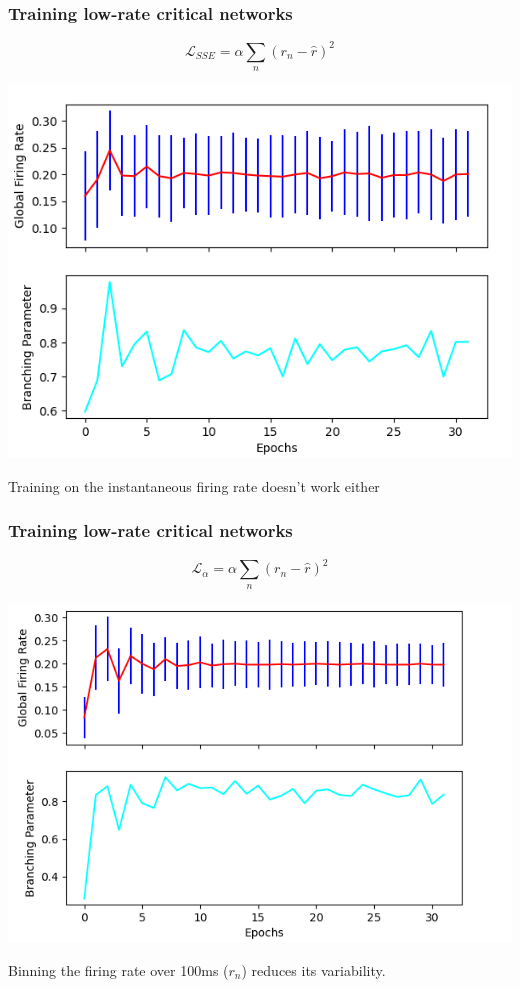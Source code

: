 \documentclass{beamer}
\begin{document}
\begin{frame}[plain]
\frametitle{Training low-rate critical networks} 

\begin{equation*}
\mathcal{L}_{SSE} = \alpha\sum_{n} (r_{n} - \hat{r})^{2}
\end{equation*}

\begin{center}
\includegraphics[scale=0.5]{sse-vars}
\end{center}

Training on the instantaneous firing rate doesn't work either

\end{frame}

\begin{frame}[plain]
\frametitle{Training low-rate critical networks} 

\begin{equation*}
\mathcal{L}_{\alpha} = \alpha\sum_{n} (r_{n} - \hat{r})^{2}
\end{equation*}

\begin{center}
\includegraphics[scale=0.5]{alpha-beta-vars}
\end{center}

Binning the firing rate over 100ms ($r_{n}$) reduces its variability.

\end{frame}
\end{document}
